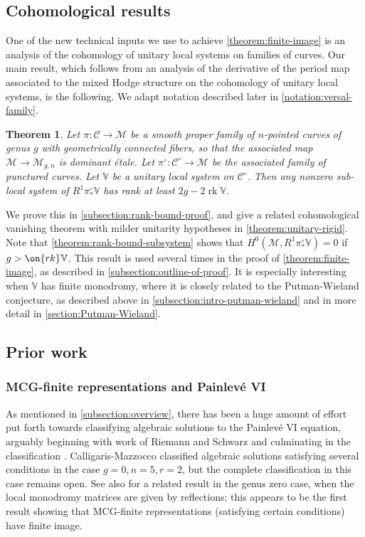 \documentclass[12 pt]{amsart}
\theoremstyle{plain}
\newtheorem{theorem}[subsubsection]{Theorem}
\theoremstyle{definition}
\theoremstyle{remark}
\numberwithin{equation}{section}
\DeclareMathOperator\rk{rk}
\begin{document}
\subsection{Cohomological results}
\label{subsection:cohomological}
One of the new technical inputs we use to achieve \autoref{theorem:finite-image} is
an analysis of the cohomology of unitary local systems on families of curves.
Our main result, which follows from an analysis of the derivative of the period
map associated to the mixed Hodge structure on the cohomology of unitary local
systems, is the following.
We adapt notation described later in \autoref{notation:versal-family}.
\begin{theorem}\label{theorem:rank-bound-subsystem}
Let $\pi:\mathscr{C}\to \mathscr{M}$ be a smooth proper family of $n$-pointed
curves of genus $g$ with geometrically connected fibers, so that the associated
map $\mathscr{M}\to \mathscr{M}_{g,n}$ is dominant \'etale. Let $\pi^\circ:
\mathscr{C}^\circ\to \mathscr{M}$ be the associated family of punctured curves.
Let $\mathbb{V}$ be a unitary local system on $\mathscr{C}^\circ$. Then any
nonzero sub-local system of $R^1\pi_*^\circ \mathbb{V}$ has rank at least $2g-2\rk\mathbb{V}$. 	
\end{theorem}
We prove this in \autoref{subsection:rank-bound-proof}, and give a related cohomological vanishing theorem with milder unitarity hypotheses in \autoref{theorem:unitary-rigid}.
Note that \autoref{theorem:rank-bound-subsystem} shows that $H^0(\mathscr{M}, R^1\pi_*^\circ \mathbb{V})=0$ if
$g>\on{rk}\mathbb{V}$. 
This result is used several times in the proof of
\autoref{theorem:finite-image}, as described in
\autoref{subsection:outline-of-proof}.
It is especially interesting when $\mathbb{V}$ has finite monodromy, where it is closely related to the Putman-Wieland conjecture, as described
above in \autoref{subsection:intro-putman-wieland} and in more detail in \autoref{section:Putman-Wieland}.


\subsection{Prior work}
\label{subsection:prior-work}
\subsubsection{MCG-finite representations and Painlev\'e VI}
\label{subsubsection:prior-mcg-finite}
As mentioned in \autoref{subsection:overview}, there has been a huge amount of effort put forth towards classifying algebraic solutions to the Painlev\'e VI equation, arguably beginning with work of Riemann \cite{riemann1857beitrage} and Schwarz \cite{schwarz1873ueber}
and culminating in the classification \cite{lisovyy2014algebraic}. 
Calligaris-Mazzocco \cite{calligaris2018finite} classified algebraic
solutions satisfying several conditions in the case $g=0, n=5, r=2$, but the complete classification in
this case remains open. See also \cite{michel-hurwitz} for a related result in the genus zero case, when the local monodromy matrices are given by reflections; this appears to be the first result showing that MCG-finite representations (satisfying certain conditions) have finite image.
\end{document}
